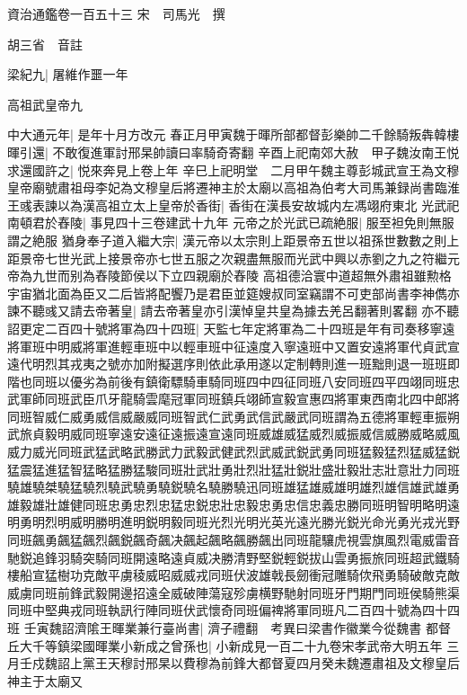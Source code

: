 資治通鑑卷一百五十三
宋　司馬光　撰

胡三省　音註

梁紀九|{
	屠維作噩一年}


高祖武皇帝九

中大通元年|{
	是年十月方改元}
春正月甲寅魏于暉所部都督彭樂帥二千餘騎叛犇韓樓暉引還|{
	不敢復進軍討邢杲帥讀曰率騎奇寄翻}
辛酉上祀南郊大赦　甲子魏汝南王悦求還國許之|{
	悦來奔見上卷上年}
辛巳上祀明堂　二月甲午魏主尊彭城武宣王為文穆皇帝廟號肅祖母李妃為文穆皇后將遷神主於太廟以高祖為伯考大司馬兼録尚書臨淮王彧表諫以為漢高祖立太上皇帝於香街|{
	香街在漢長安故城内左馮翊府東北}
光武祀南頓君於舂陵|{
	事見四十三卷建武十九年}
元帝之於光武已疏絶服|{
	服至袒免則無服謂之絶服}
猶身奉子道入繼大宗|{
	漢元帝以太宗則上距景帝五世以祖孫世數數之則上距景帝七世光武上接景帝亦七世五服之次親盡無服而光武中興以赤劉之九之符繼元帝為九世而别為舂陵節侯以下立四親廟於舂陵}
高祖德洽寰中道超無外肅祖雖勲格宇宙猶北面為臣又二后皆將配饗乃是君臣並筵嫂叔同室竊謂不可吏部尚書李神儁亦諫不聽彧又請去帝著皇|{
	請去帝著皇亦引漢悼皇共皇為據去羌呂翻著則畧翻}
亦不聽　詔更定二百四十號將軍為四十四班|{
	天監七年定將軍為二十四班是年有司奏移寧遠將軍班中明威將軍進輕車班中以輕車班中征遠度入寧遠班中又置安遠將軍代貞武宣遠代明烈其戎夷之號亦加附擬選序則依此承用遂以定制轉則進一班黜則退一班班即階也同班以優劣為前後有鎮衛驃騎車騎同班四中四征同班八安同班四平四翊同班忠武軍師同班武臣爪牙龍騎雲麾冠軍同班鎮兵翊師宣毅宣惠四將軍東西南北四中郎將同班智威仁威勇威信威嚴威同班智武仁武勇武信武嚴武同班謂為五德將軍輕車振朔武旅貞毅明威同班寧遠安遠征遠振遠宣遠同班威雄威猛威烈威振威信威勝威略威風威力威光同班武猛武略武勝武力武毅武健武烈武威武鋭武勇同班猛毅猛烈猛威猛鋭猛震猛進猛智猛略猛勝猛駿同班壯武壯勇壯烈壯猛壯鋭壯盛壯毅壯志壯意壯力同班驍雄驍桀驍猛驍烈驍武驍勇驍鋭驍名驍勝驍迅同班雄猛雄威雄明雄烈雄信雄武雄勇雄毅雄壯雄健同班忠勇忠烈忠猛忠鋭忠壯忠毅忠勇忠信忠義忠勝同班明智明略明遠明勇明烈明威明勝明進明鋭明毅同班光烈光明光英光遠光勝光鋭光命光勇光戎光野同班飆勇飆猛飆烈飆鋭飆奇飆决飆起飆略飆勝飆出同班龍驤虎視雲旗風烈電威雷音馳鋭追鋒羽騎突騎同班開遠略遠貞威决勝清野堅鋭輕鋭拔山雲勇振旅同班超武鐵騎樓船宣猛樹功克敵平虜稜威昭威威戎同班伏波雄戟長劒衝冠雕騎佽飛勇騎破敵克敵威虜同班前鋒武毅開邊招遠全威破陣蕩寇殄虜横野馳射同班牙門期門同班侯騎熊渠同班中堅典戎同班執訊行陣同班伏武懷奇同班偏禆將軍同班凡二百四十號為四十四班}
壬寅魏詔濟隂王暉業兼行臺尚書|{
	濟子禮翻　考異曰梁書作徽業今從魏書}
都督丘大千等鎮梁國暉業小新成之曾孫也|{
	小新成見一百二十九卷宋孝武帝大明五年}
三月壬戍魏詔上黨王天穆討邢杲以費穆為前鋒大都督夏四月癸未魏遷肅祖及文穆皇后神主于太廟又

